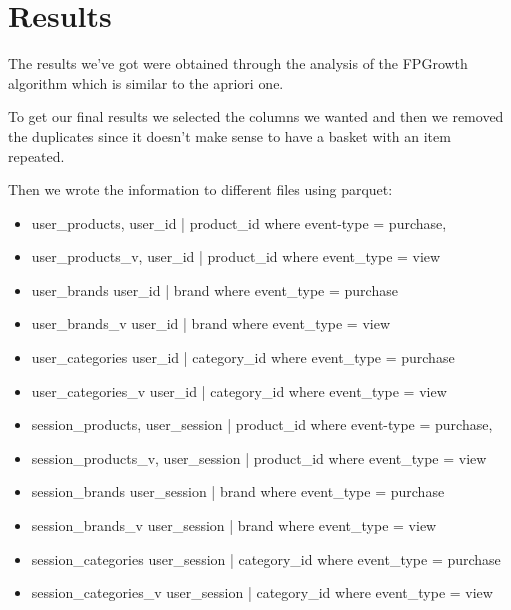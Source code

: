 \section{Results}
\label{results}

The results we've got were obtained through the analysis of the FPGrowth algorithm which is similar to the apriori one.

To get our final results we selected the columns we wanted and then we removed the duplicates since it doesn't make
sense to have a basket with an item repeated. 

Then we wrote the information to different files using parquet:
\begin{itemize}
    \item user_products, user_id | product_id where event-type = purchase, 
    \item user_products_v, user_id | product_id where event_type = view 
    \item user_brands user_id | brand where event_type = purchase
    \item user_brands_v user_id | brand where event_type = view
    \item user_categories user_id | category_id where event_type = purchase
    \item user_categories_v user_id | category_id where event_type = view
    \item session_products, user_session | product_id where event-type = purchase, 
    \item session_products_v, user_session | product_id where event_type = view 
    \item session_brands user_session | brand where event_type = purchase
    \item session_brands_v user_session | brand where event_type = view
    \item session_categories user_session | category_id where event_type = purchase
    \item session_categories_v user_session | category_id where event_type = view
\end{itemize}

